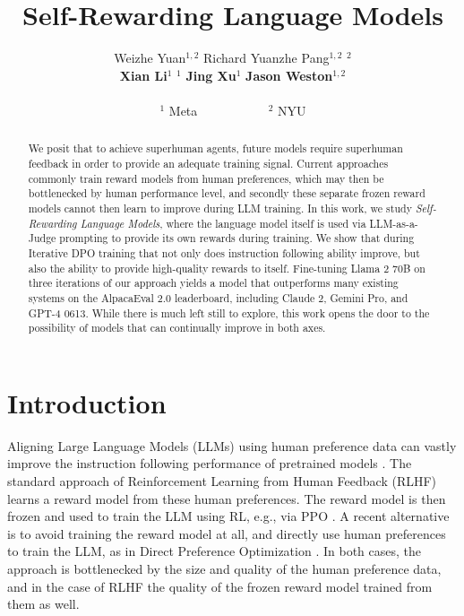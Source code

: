 \documentclass{article}
\title{Self-Rewarding Language Models}
\author{%
  Weizhe Yuan$^{1,2}$ \quad Richard Yuanzhe Pang$^{1,2}$  \quad {Kyunghyun Cho}$^{2}$  \\ {\bf Xian Li}$^{1}$ \quad {\bf Sainbayar Sukhbaatar}$^{1}$  \quad     \textbf{Jing Xu}$^{1}$ 
  \quad \textbf{Jason Weston}$^{1,2}$   \\\\
  $^1$ Meta ~~~~~~~~~~ $^{2}$ NYU \\
}
\begin{document}
\maketitle


\begin{abstract}
We posit that to achieve superhuman agents, future models require 
superhuman feedback in order to provide an adequate training signal.
Current approaches commonly train reward models from human preferences, which may then be
bottlenecked by human performance level,
and secondly these separate  frozen reward models  cannot then learn to improve during LLM training.
In this work, we study {\em Self-Rewarding Language Models}, where the language model itself is used via LLM-as-a-Judge prompting to provide its own rewards during training. We show that 
during Iterative DPO training that 
 not only does instruction following ability improve, but also the ability to provide high-quality rewards to itself. 
Fine-tuning Llama 2 70B on three iterations of our approach yields a model that outperforms 
many existing systems on the AlpacaEval 2.0 leaderboard, including Claude 2, Gemini Pro, and GPT-4 0613.
While there is much left still to explore,  this work opens the door to the possibility of models that can continually improve in both axes.
\end{abstract}




\section{Introduction}

Aligning Large Language Models (LLMs) 
using human preference data can vastly improve the instruction following 
performance of pretrained models \citep{ouyang2022training,bai2022training}. %
The standard approach of Reinforcement Learning from Human Feedback (RLHF) 
learns a reward model from these human preferences. The reward model is then frozen and used to train the LLM using RL, e.g., via  PPO \citep{schulman2017proximal}.  A recent alternative is to avoid training the reward model at all, and directly use human preferences to train the LLM, as in Direct Preference Optimization \citep[DPO;][]{rafailov2023direct}.
In both cases, the approach is bottlenecked by the size and quality of the human preference data, and in the case of RLHF the quality of the frozen reward model trained from them as well. 
\end{document}
